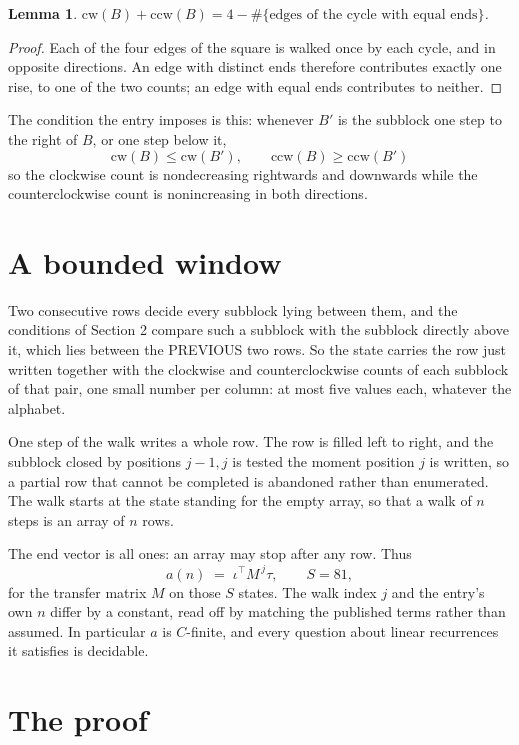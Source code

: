 \documentclass[11pt,a4paper]{article}
\theoremstyle{plain}
\newtheorem{lemma}[theorem]{Lemma}
\theoremstyle{definition}
\begin{document}
\begin{lemma}\label{lem:sum}
$\mathrm{cw}(B)+\mathrm{ccw}(B)=4-\#\{\text{edges of the cycle with equal ends}\}$.
\end{lemma}

\begin{proof}
Each of the four edges of the square is walked once by each cycle, and in opposite directions.
An edge with distinct ends therefore contributes exactly one rise, to one of the two counts;
an edge with equal ends contributes to neither.
\end{proof}

The condition the entry imposes is this: whenever $B'$ is the subblock one step to the right of $B$, or one step below it, 
\[
\mathrm{cw}(B)\le\mathrm{cw}(B'),\qquad \mathrm{ccw}(B)\ge\mathrm{ccw}(B')
\]
so the clockwise count is nondecreasing rightwards and downwards while the counterclockwise count is nonincreasing in both directions.

\section{A bounded window}

Two consecutive rows decide every subblock lying between them, and the conditions of Section 2 compare such a subblock with the subblock directly above it, which lies between the PREVIOUS two rows. So the state carries the row just written together with the clockwise and counterclockwise counts of each subblock of that pair, one small number per column: at most five values each, whatever the alphabet.

One step of the walk writes a whole row. The row is filled left to right, and the subblock
closed by positions $j-1,j$ is tested the moment position $j$ is written, so a partial row that
cannot be completed is abandoned rather than enumerated. The walk starts at the state standing
for the empty array, so that a walk of $n$ steps is an array of $n$ rows.

The end vector is all ones: an array may stop after any row. Thus
\[
a(n)\;=\;\iota^{\!\top}M^{\,j}\tau ,\qquad S=81,
\]
for the transfer matrix $M$ on those $S$ states. The walk index $j$ and the entry's own $n$
differ by a constant, read off by matching the published terms rather than assumed. In
particular $a$ is $C$-finite, and every question about linear recurrences it satisfies is
decidable.

\section{The proof}
\end{document}
